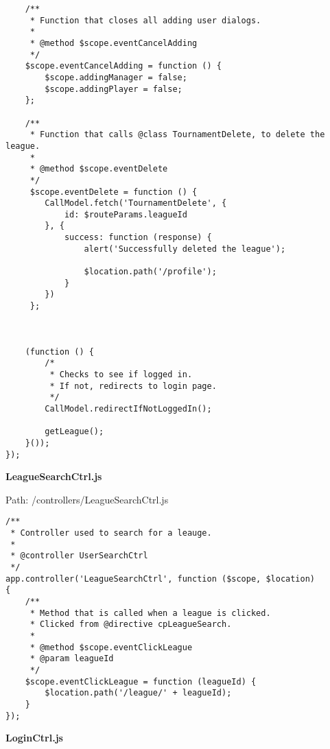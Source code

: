{\begin{lstlisting}
	/**
	 * Function that closes all adding user dialogs.
	 *
	 * @method $scope.eventCancelAdding
	 */
	$scope.eventCancelAdding = function () {
		$scope.addingManager = false;
		$scope.addingPlayer = false;
	};

	/**
	 * Function that calls @class TournamentDelete, to delete the league.
	 *
	 * @method $scope.eventDelete
	 */
	 $scope.eventDelete = function () {
	 	CallModel.fetch('TournamentDelete', {
	 		id: $routeParams.leagueId
	 	}, {
	 		success: function (response) {
	 			alert('Successfully deleted the league');

	 			$location.path('/profile');
	 		}
	 	})
	 };



	(function () {
		/* 
		 * Checks to see if logged in.
		 * If not, redirects to login page.
		 */
		CallModel.redirectIfNotLoggedIn();

		getLeague();
	}());
});\end{lstlisting}
}
\textbf{LeagueSearchCtrl.js}

Path: /controllers/LeagueSearchCtrl.js
{\scriptsize
\begin{lstlisting}
/**
 * Controller used to search for a leauge.
 *
 * @controller UserSearchCtrl
 */
app.controller('LeagueSearchCtrl', function ($scope, $location)
{
	/**
	 * Method that is called when a league is clicked.
	 * Clicked from @directive cpLeagueSearch.
	 *
	 * @method $scope.eventClickLeague
	 * @param leagueId
	 */
	$scope.eventClickLeague = function (leagueId) {
		$location.path('/league/' + leagueId);
	}
});\end{lstlisting}
}
\textbf{LoginCtrl.js}

